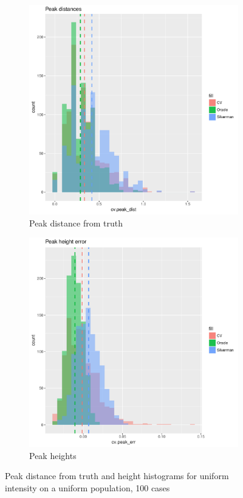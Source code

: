 \begin{figure}[htbp]
    \centering
    \begin{subfigure}[b]{0.45\textwidth}
    \includegraphics[width=\textwidth]{output/peak-dist-histogram}
    \caption{Peak distance from truth}
    \end{subfigure}
    \begin{subfigure}[b]{0.45\textwidth}
    \includegraphics[width=\textwidth]{output/peak-height-histogram}
    \caption{Peak heights}
    \end{subfigure}
    \caption[Peaks: uniform on uniform]{Peak distance from truth and height histograms for uniform intensity on a uniform population, 100 cases}
    \label{fig:peaks:template}
\end{figure}

